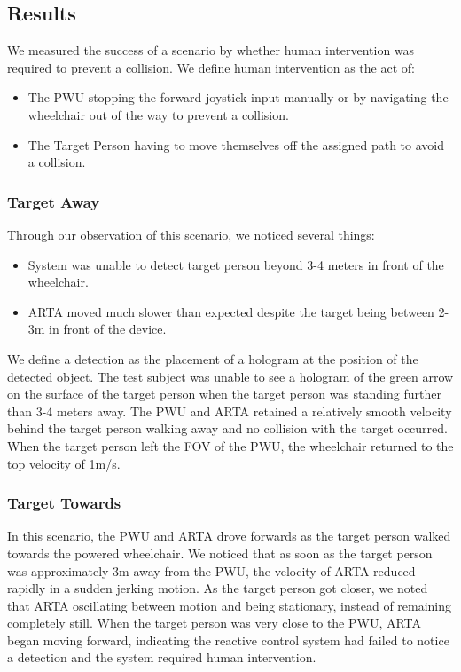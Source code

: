 \subsection{Results}
We measured the success of a scenario by whether human intervention was required to prevent a collision. We define human intervention as the act of:

\begin{itemize}
	\item The PWU stopping the forward joystick input manually or by navigating the wheelchair out of the way to prevent a collision.
	\item The Target Person having to move themselves off the assigned path to avoid a collision.  
\end{itemize}

\subsubsection{Target Away}
Through our observation of this scenario, we noticed several things:

\begin{itemize}
	\item System was unable to detect target person beyond 3-4 meters in front of the wheelchair.
	\item ARTA moved much slower than expected despite the target being between 2-3m in front of the device.
\end{itemize}

We define a detection as the placement of a hologram at the position of the detected object. The test subject was unable to see a hologram of the green arrow on the surface of the target person when the target person was standing further than 3-4 meters away. The PWU and ARTA retained a relatively smooth velocity behind the target person walking away and no collision with the target occurred. When the target person left the FOV of the PWU, the wheelchair returned to the top velocity of 1m/s.

\subsubsection{Target Towards}
In this scenario, the PWU and ARTA drove forwards as the target person walked towards the powered wheelchair. We noticed that as soon as the target person was approximately 3m away from the PWU, the velocity of ARTA reduced rapidly in a sudden jerking motion. As the target person got closer, we noted that ARTA oscillating between motion and being stationary, instead of remaining completely still. When the target person was very close to the PWU, ARTA began moving forward, indicating the reactive control system had failed to notice a detection and the system required human intervention. 


